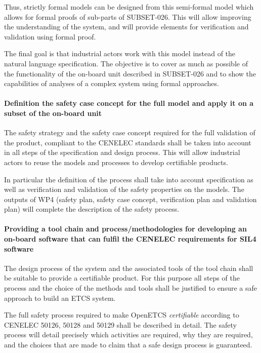 Thus, strictly formal models can be designed from this semi-formal model which allows for formal proofs of sub-parts of SUBSET-026. This will allow improving the understanding of the system, and will provide elements for verification and validation using formal proof.

The final goal is that industrial actors work with this model instead of the
natural language specification.
The objective is to cover as much as possible of the  functionality of the on-board unit described in SUBSET-026 and to show the capabilities of analyses of a complex system using formal approaches.

\paragraph{Definition the safety case concept for the full model and apply it on a subset of the on-board unit}
The safety strategy and the safety case concept required for the full validation of the product, compliant to the CENELEC standards shall be taken into account in all steps of the specification and design process. This will allow industrial actors to reuse the models and processes to develop certifiable products.

In particular the definition of the process shall take into account specification as well as verification and validation of the safety properties on the models. The outputs of WP4 (safety plan, safety case concept, verification plan and validation plan) will complete the description of the safety process.


\paragraph{Providing a tool chain and process/methodologies for developing
an on-board software that can fulfil the CENELEC requirements for SIL4 software}

The design process of the system and the associated tools of the tool chain shall be suitable to provide a certifiable product. For this purpose all steps of the process and the choice of the methods and tools shall be justified to ensure a safe approach to build an ETCS system.

The full safety process required to make OpenETCS \emph{certifiable} according to CENELEC 50126, 50128 and 50129 shall be described in detail. The safety process will detail precisely which activities are required, why they are required, and the choices that are made to claim that a safe design process is guaranteed.

